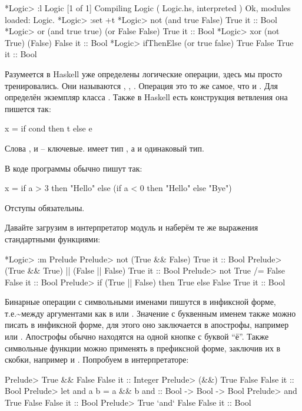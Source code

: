 \begin{code}
*Logic> :l Logic
[1 of 1] Compiling Logic            ( Logic.hs, interpreted )
Ok, modules loaded: Logic.
*Logic> :set +t
*Logic> not (and true False)
True
it :: Bool
*Logic> or (and true true) (or False False)
True
it :: Bool
*Logic> xor (not True) (False)
False
it :: Bool
*Logic> ifThenElse (or true false) True False
True
it :: Bool
\end{code}

Разумеется в Haskell уже определены логические операции, здесь мы просто
тренировались. Они называются , \In{(&&)}, \In{||}. Операция
 это то же самое, что и \In{(/=)}. Для  определён
экземпляр класса . Также в Haskell есть конструкция ветвления она
пишется так:


\begin{code}
x = if cond then t else e
\end{code}

Слова ,  и  -- ключевые.  имеет тип
, а  и  одинаковый тип.

В коде программы обычно пишут так:


\begin{code}
x = if a > 3 
    then "Hello"
    else (if a < 0
          then "Hello"
          else "Bye")
\end{code}

Отступы обязательны.

Давайте загрузим в интерпретатор модуль  и наберём те же
выражения стандартными функциями:


\begin{code}
*Logic> :m Prelude
Prelude> not (True && False)
True
it :: Bool
Prelude> (True && True) || (False || False)
True
it :: Bool
Prelude> not True /= False
False
it :: Bool
Prelude> if (True || False) then True else False
True
it :: Bool
\end{code}

Бинарные операции с символьными именами пишутся в инфиксной форме,
т.е.\textasciitilde{}между аргументами как в  или .
Значение с буквенным именем также можно писать в инфиксной форме, для
этого оно заключается в апострофы, например  или
. Апострофы обычно находятся на одной кнопке с буквой
``ё''. Также символьные функции можно применять в префиксной форме,
заключив их в скобки, например  и . Попробуем в
интерпретаторе:


\begin{code}
Prelude> True && False
False
it :: Integer
Prelude> (&&) True False
False
it :: Bool
Prelude> let and a b = a && b
and :: Bool -> Bool -> Bool
Prelude> and True False
False
it :: Bool
Prelude> True `and` False
False
it :: Bool
\end{code}

